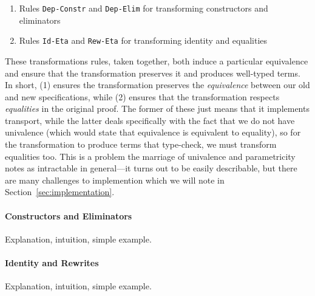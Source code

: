 \begin{enumerate}
\item Rules \lstinline{Dep-Constr} and \lstinline{Dep-Elim} for transforming constructors and eliminators 
\item Rules \lstinline{Id-Eta} and \lstinline{Rew-Eta} for transforming identity and equalities
\end{enumerate}
These transformations rules, taken together, both induce a particular equivalence and ensure that the transformation
preserves it and produces well-typed terms.
In short, (1) ensures the transformation preserves the \textit{equivalence} between our old and new specifications,
while (2) ensures that the transformation respects \textit{equalities} in the original proof.
The former of these just means that it implements transport, while the latter deals specifically
with the fact that we do not have univalence (which would state that equivalence is equivalent to equality),
so for the transformation to produce terms that type-check, we must transform equalities too.
This is a problem the marriage of univalence and parametricity notes as intractable in general---it turns out
to be easily describable, but there are many challenges to implemention which we will note in Section~\ref{sec:implementation}.

\paragraph{Constructors and Eliminators} Explanation, intuition, simple example.

\paragraph{Identity and Rewrites} Explanation, intuition, simple example.

